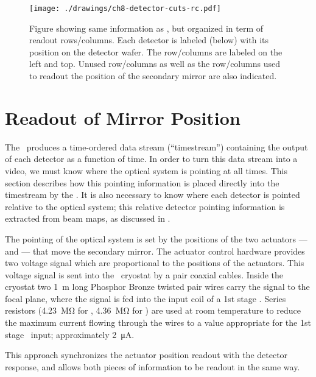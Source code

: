 \begin{figure}
\centering
\texttt{[image: ./drawings/ch8-detector-cuts-rc.pdf]}
\caption{
  Figure showing same information as , but organized in term of readout rows/columns. Each detector is labeled (below) with its position on the detector wafer.
  The row/columns are labeled on the left and top. Unused row/columns as well as the row/columns used to readout the position of the secondary mirror are also indicated. }
\label{fig:detector-cuts-rc}
\end{figure}

\section{Readout of Mirror Position}\label{sec:ch8-mirror-readout}

The \Imager\ produces a time-ordered data stream (``timestream'') containing the output of each detector as a function of time.
In order to turn this data stream into a video, we must know where the optical system is pointing at all times.
This section describes how this pointing information is placed directly into the timestream by the \Imager.
It is also necessary to know where each detector is pointed relative to the optical system; this relative detector pointing information is extracted from beam maps, as discussed in .

The pointing of the optical system is set by the positions of the two actuators ---  and  --- that move the secondary mirror.
The actuator control hardware provides two voltage signal which are proportional to the positions of the actuators.
This voltage signal is sent into the \Imager\ cryostat by a pair coaxial cables.
Inside the cryostat two \SI{1}{m} long Phosphor Bronze  twisted pair wires carry the signal to the focal plane, where the signal is fed into the input coil of a 1st stage \SQUID.
Series resistors (\SI{4.23}{\mega\ohm} for , \SI{4.36}{\mega\ohm} for ) are used at room temperature to reduce the maximum current flowing through the wires to a value appropriate for the 1st stage \SQUID\ input; approximately \SI{2}{\uA}.


This approach synchronizes the actuator position readout with the detector response, and allows both pieces of information to be readout in the same way.

